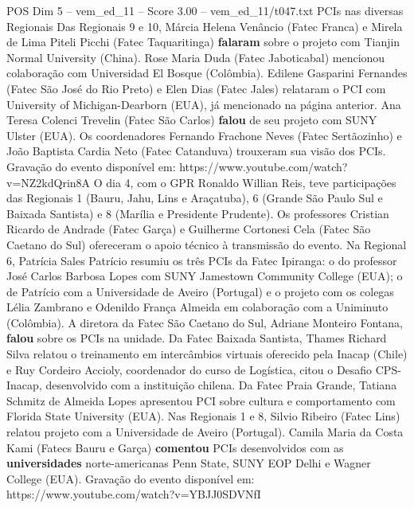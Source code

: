 \begin{textsample}{POS Dim 5 – vem\_ed\_11 – Score 3.00 – vem\_ed\_11/t047.txt}  \label{ex:f5_pos_113}
PCIs nas diversas Regionais Das Regionais 9 e 10, Márcia Helena Venâncio (Fatec Franca) e Mirela de Lima Piteli Picchi (Fatec Taquaritinga) \textbf{falaram} sobre o projeto com Tianjin Normal University (China).
Rose Maria Duda (Fatec Jaboticabal) mencionou colaboração com Universidad El Bosque (Colômbia).
Edilene Gasparini Fernandes (Fatec São José do Rio Preto) e Elen Dias (Fatec Jales) relataram o PCI com University of Michigan-Dearborn (EUA), já mencionado na página anterior.
Ana Teresa Colenci Trevelin (Fatec São Carlos) \textbf{falou} de seu projeto com SUNY Ulster (EUA).
Os coordenadores Fernando Frachone Neves (Fatec Sertãozinho) e João Baptista Cardia Neto (Fatec Catanduva) trouxeram sua visão dos PCIs.
Gravação do evento disponível em: https://www.youtube.com/watch?v=NZ2kdQrin8A O dia 4, com o GPR Ronaldo Willian Reis, teve participações das Regionais 1 (Bauru, Jahu, Lins e Araçatuba), 6 (Grande São Paulo Sul e Baixada Santista) e 8 (Marília e Presidente Prudente).
Os professores Cristian Ricardo de Andrade (Fatec Garça) e Guilherme Cortonesi Cela (Fatec São Caetano do Sul) ofereceram o apoio técnico à transmissão do evento.
Na Regional 6, Patrícia Sales Patrício resumiu os três PCIs da Fatec Ipiranga: o do professor José Carlos Barbosa Lopes com SUNY Jamestown Community College (EUA); o de Patrício com a Universidade de Aveiro (Portugal) e o projeto com os colegas Lélia Zambrano e Odenildo França Almeida em colaboração com a Uniminuto (Colômbia).
A diretora da Fatec São Caetano do Sul, Adriane Monteiro Fontana, \textbf{falou} sobre os PCIs na unidade.
Da Fatec Baixada Santista, Thames Richard Silva relatou o treinamento em intercâmbios virtuais oferecido pela Inacap (Chile) e Ruy Cordeiro Accioly, coordenador do curso de Logística, citou o Desafio CPS-Inacap, desenvolvido com a instituição chilena.
Da Fatec Praia Grande, Tatiana Schmitz de Almeida Lopes apresentou PCI sobre cultura e comportamento com Florida State University (EUA).
Nas Regionais 1 e 8, Silvio Ribeiro (Fatec Lins) relatou projeto com a Universidade de Aveiro (Portugal).
Camila Maria da Costa Kami (Fatecs Bauru e Garça) \textbf{comentou} PCIs desenvolvidos com as \textbf{universidades} norte-americanas Penn State, SUNY EOP Delhi e Wagner College (EUA).
Gravação do evento disponível em: https://www.youtube.com/watch?v=YBJJ0SDVNfI

\end{textsample}
